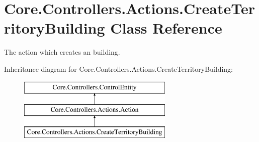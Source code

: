 \hypertarget{classCore_1_1Controllers_1_1Actions_1_1CreateTerritoryBuilding}{}\section{Core.\+Controllers.\+Actions.\+Create\+Territory\+Building Class Reference}
\label{classCore_1_1Controllers_1_1Actions_1_1CreateTerritoryBuilding}


The action which creates an building.  


Inheritance diagram for Core.\+Controllers.\+Actions.\+Create\+Territory\+Building\+:\begin{figure}[H]
\begin{center}
\leavevmode
\includegraphics[height=3.000000cm]{classCore_1_1Controllers_1_1Actions_1_1CreateTerritoryBuilding}
\end{center}
\end{figure}
